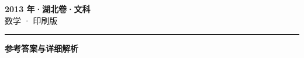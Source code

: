 \documentclass[zihao=5, a4paper]{ctexart}
\begin{document}
\begin{center}
  {\Large\bfseries 2013 年·湖北卷·文科}\\[4pt]
  {\large 数学 · 印刷版}
\end{center}
\medskip
{}

\par\bigskip\hrule\bigskip
{}
\Needspace{0.55\textheight}
\begin{center}{\large\bfseries 参考答案与详细解析}\end{center}
\smallskip

\end{document}
